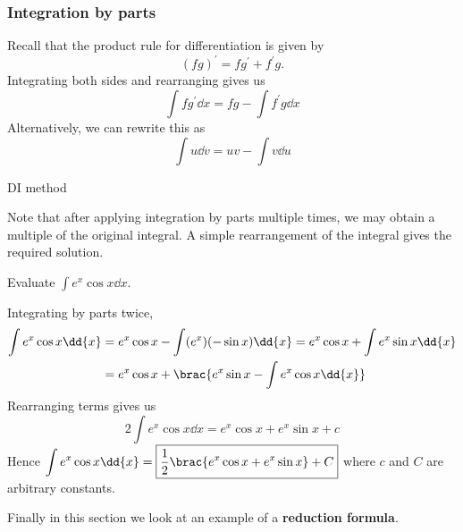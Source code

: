 \subsubsection{Integration by parts}
Recall that the product rule for differentiation is given by
\[ (fg)^\prime=fg^\prime+f^\prime g. \]
Integrating both sides and rearranging gives us
\begin{equation}
\int f g^\prime\dd{x} = fg - \int f^\prime g\dd{x}
\end{equation}
Alternatively, we can rewrite this as 
\begin{equation}
\int u \dd{v} = uv - \int v \dd{u}
\end{equation}

DI method

Note that after applying integration by parts multiple times, we may obtain a multiple of the original integral. A simple rearrangement of the integral gives the required solution.

\begin{exercise}
Evaluate $\int e^x\cos x\dd{x}$.
\end{exercise}
\begin{solution}
Integrating by parts twice,
\begin{align*}
\int e^x\cos x\dd{x}
&= e^x\cos x-\int(e^x)(-\sin x)\dd{x}=e^x\cos x+\int e^x\sin x\dd{x} \\
&= e^x\cos x+\brac{e^x\sin x-\int e^x\cos x\dd{x}}
\end{align*}
Rearranging terms gives us
\[ 2\int e^x\cos x\dd{x}=e^x\cos x+e^x\sin x+c \]
Hence $\displaystyle\int e^x\cos x\dd{x}=\boxed{\frac{1}{2}\brac{e^x\cos x+e^x\sin x}+C}$
where $c$ and $C$ are arbitrary constants.
\end{solution}

Finally in this section we look at an example of a \textbf{reduction formula}.

